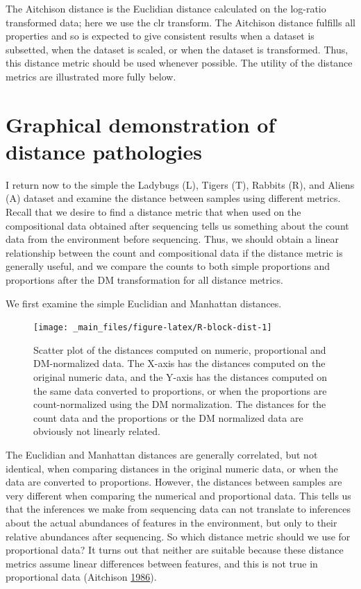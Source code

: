 \documentclass[onecolumn]{book}
\theoremstyle{definition}
\theoremstyle{definition}
\theoremstyle{definition}
\theoremstyle{remark}
\begin{document}
The Aitchison distance is the Euclidian distance calculated on the
log-ratio transformed data; here we use the clr transform. The Aitchison
distance fulfills all properties and so is expected to give consistent
results when a dataset is subsetted, when the dataset is scaled, or when
the dataset is transformed. Thus, this distance metric should be used
whenever possible. The utility of the distance metrics are illustrated
more fully below.

\hypertarget{graphical-demonstration-of-distance-pathologies}{%
\section{Graphical demonstration of distance
pathologies}\label{graphical-demonstration-of-distance-pathologies}}

I return now to the simple the Ladybugs (L), Tigers (T), Rabbits (R),
and Aliens (A) dataset and examine the distance between samples using
different metrics. Recall that we desire to find a distance metric that
when used on the compositional data obtained after sequencing tells us
something about the count data from the environment before sequencing.
Thus, we should obtain a linear relationship between the count and
compositional data if the distance metric is generally useful, and we
compare the counts to both simple proportions and proportions after the
DM transformation for all distance metrics.

We first examine the simple Euclidian and Manhattan distances.

\begin{figure}

{\centering \texttt{[image: \_main\_files/figure-latex/R-block-dist-1]} 

}

\caption{Scatter plot of the distances computed on numeric, proportional and DM-normalized data. The X-axis has the distances computed on the original numeric data, and the Y-axis has the distances computed on the same data converted to proportions, or when the proportions are count-normalized using the DM normalization. The distances for the count data and the proportions or the DM normalized data are obviously not linearly related.}\label{fig:R-block-dist}
\end{figure}

The Euclidian and Manhattan distances are generally correlated, but not
identical, when comparing distances in the original numeric data, or
when the data are converted to proportions. However, the distances
between samples are very different when comparing the numerical and
proportional data. This tells us that the inferences we make from
sequencing data can not translate to inferences about the actual
abundances of features in the environment, but only to their relative
abundances after sequencing. So which distance metric should we use for
proportional data? It turns out that neither are suitable because these
distance metrics assume linear differences between features, and this is
not true in proportional data (Aitchison
\protect\hyperlink{ref-Aitchison:1986}{1986}).
\end{document}
